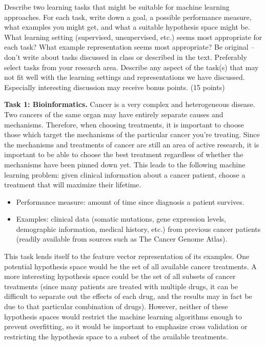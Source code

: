 \documentclass[fleqn]{homework}
\begin{document}
  \begin{problem}{3}
    \begin{question}
      Describe two learning tasks that might be suitable for machine learning
      approaches.  For each task, write down a goal, a possible performance
      measure, what examples you might get, and what a suitable hypothesis space
      might be.  What learning setting (supervised, unsupervised, etc.) seems
      most appropriate for each task?  What example representation seems most
      appropriate?  Be original -- don't write about tasks discussed in class or
      described in the text.  Preferably select tasks from your research area.
      Describe any aspect of the task(s) that may not fit well with the learning
      settings and representations we have discussed.  Especially interesting
      discussion may receive bonus points. (15 points)
    \end{question}

    \textbf{Task 1: Bioinformatics.}  Cancer is a very complex and heterogeneous
    disease.  Two cancers of the same organ may have entirely separate causes
    and mechanisms.  Therefore, when choosing treatments, it is important to
    choose those which target the mechanisms of the particular cancer you're
    treating.  Since the mechanisms and treatments of cancer are still an area
    of active research, it is important to be able to choose the best treatment
    regardless of whether the mechanisms have been pinned down yet.  This leads
    to the following machine learning problem: given clinical information about
    a cancer patient, choose a treatment that will maximize their lifetime.

    \begin{itemize}
    \item Performance measure: amount of time since diagnosis a patient
      survives.
    \item Examples: clinical data (somatic mutations, gene expression levels,
      demographic information, medical history, etc.) from previous cancer
      patients (readily available from sources such as The Cancer Genome Atlas).
    \end{itemize}

    This task lends itself to the feature vector representation of its examples.
    One potential hypothesis space would be the set of all available cancer
    treatments.  A more interesting hypothesis space could be the set of all
    subsets of cancer treatments (since many patients are treated with multiple
    drugs, it can be difficult to separate out the effects of each drug, and the
    results may in fact be due to that particular combination of drugs).
    However, neither of these hypothesis spaces would restrict the machine
    learning algorithms enough to prevent overfitting, so it would be important
    to emphasize cross validation or restricting the hypothesis space to a
    subset of the available treatments.


\end{problem}
\end{document}

